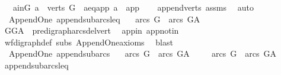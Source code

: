\begin{isabellebody}
\ \ \ {\isacharparenleft}{\kern0pt}a{\isacharunderscore}{\kern0pt}in{\isacharunderscore}{\kern0pt}G{\isacharparenright}{\kern0pt}\ {\isachardoublequoteopen}a\ {\isasymin}\ verts\ G{\isachardoublequoteclose}\ {\isacharbar}{\kern0pt}\ {\isacharparenleft}{\kern0pt}a{\isacharunderscore}{\kern0pt}eq{\isacharunderscore}{\kern0pt}app{\isacharparenright}{\kern0pt}\ {\isachardoublequoteopen}a\ {\isacharequal}{\kern0pt}\ app{\isachardoublequoteclose}\isanewline
%
\isadelimproof
\ \ %
\endisadelimproof
%
\isatagproof
{}\isamarkupfalse%
\ append{\isacharunderscore}{\kern0pt}verts\ assms\ \isamarkupfalse%
\ auto%
\endisatagproof
{\isafoldproof}%
%
\isadelimproof
\isanewline
%
\endisadelimproof
\isanewline
{}\isamarkupfalse%
\ {\isacharparenleft}{\kern0pt}\ Append{\isacharunderscore}{\kern0pt}One{\isacharparenright}{\kern0pt}\ append{\isacharunderscore}{\kern0pt}subarcs{\isacharunderscore}{\kern0pt}leq{\isacharcolon}{\kern0pt}\ \isanewline
\ \ {\isachardoublequoteopen}arcs\ G\ {\isasymsubseteq}\ arcs\ G{\isacharunderscore}{\kern0pt}A{\isachardoublequoteclose}\isanewline
%
\isadelimproof
\ \ %
\endisadelimproof
%
\isatagproof
{}\isamarkupfalse%
\ GG{\isacharunderscore}{\kern0pt}A\ \ pre{\isacharunderscore}{\kern0pt}digraph{\isachardot}{\kern0pt}arcs{\isacharunderscore}{\kern0pt}del{\isacharunderscore}{\kern0pt}vert\ \isamarkupfalse%
\ app{\isacharunderscore}{\kern0pt}in\ app{\isacharunderscore}{\kern0pt}notin\ \isanewline
\ \ \isamarkupfalse%
\ wf{\isacharunderscore}{\kern0pt}digraph{\isacharunderscore}{\kern0pt}def\ subs\ Append{\isacharunderscore}{\kern0pt}One{\isacharunderscore}{\kern0pt}axioms\ \isamarkupfalse%
\ blast%
\endisatagproof
{\isafoldproof}%
%
\isadelimproof
\isanewline
%
\endisadelimproof
\ \ \isanewline
{}\isamarkupfalse%
\ {\isacharparenleft}{\kern0pt}\ Append{\isacharunderscore}{\kern0pt}One{\isacharparenright}{\kern0pt}\ append{\isacharunderscore}{\kern0pt}subarcs{\isacharcolon}{\kern0pt}\ \isanewline
\ \ {\isachardoublequoteopen}arcs\ G\ {\isasymsubset}\ arcs\ G{\isacharunderscore}{\kern0pt}A{\isachardoublequoteclose}\isanewline
%
\isadelimproof
%
\endisadelimproof
%
\isatagproof
{}\isamarkupfalse%
\isanewline
\ \ \isamarkupfalse%
\ \ {\isachardoublequoteopen}arcs\ G\ {\isasymsubseteq}\ arcs\ G{\isacharunderscore}{\kern0pt}A{\isachardoublequoteclose}\ \isamarkupfalse%
\ append{\isacharunderscore}{\kern0pt}subarcs{\isacharunderscore}{\kern0pt}leq\ \isamarkupfalse%

\end{isabellebody}
